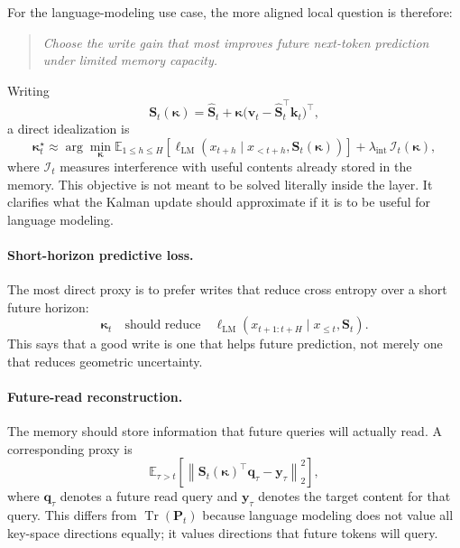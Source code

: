 \documentclass[11pt]{article}
\newcommand{\ve}[1]{\boldsymbol{#1}}
\newcommand{\tr}{\intercal}
\DeclareMathOperator{\Trace}{Tr}
\begin{document}
For the language-modeling use case, the more aligned local question is therefore:
\begin{quote}
  \emph{Choose the write gain that most improves future next-token prediction under limited
  memory capacity.}
\end{quote}
Writing
\[
  \ve{S}_t(\ve{\kappa})
  =
  \widehat{\ve{S}}_t
  +
  \ve{\kappa}
  \big(\ve{v}_t-\widehat{\ve{S}}_t^{\tr}\ve{k}_t\big)^{\tr},
\]
a direct idealization is
\begin{equation}
  \ve{\kappa}_t^\star
  \approx
  \arg\min_{\ve{\kappa}}
  \mathbb{E}_{1\le h\le H}
  \left[
    \ell_{\mathrm{LM}}\!\left(
      x_{t+h}\mid x_{<t+h},\ve{S}_t(\ve{\kappa})
    \right)
  \right]
  +
  \lambda_{\mathrm{int}}\,
  \mathcal{I}_t(\ve{\kappa}),
  \label{eq:lm-predictive-memory-objective}
\end{equation}
where $\mathcal{I}_t$ measures interference with useful contents already stored in the
memory. This objective is not meant to be solved literally inside the layer. It clarifies
what the Kalman update should approximate if it is to be useful for language modeling.

\paragraph{Short-horizon predictive loss.}
The most direct proxy is to prefer writes that reduce cross entropy over a short future
horizon:
\[
  \ve{\kappa}_t
  \quad\text{should reduce}\quad
  \ell_{\mathrm{LM}}(x_{t+1:t+H}\mid x_{\le t},\ve{S}_t).
\]
This says that a good write is one that helps future prediction, not merely one that reduces
geometric uncertainty.

\paragraph{Future-read reconstruction.}
The memory should store information that future queries will actually read. A corresponding
proxy is
\[
  \mathbb{E}_{\tau>t}
  \left[
    \left\|
      \ve{S}_t(\ve{\kappa})^{\tr}\ve{q}_{\tau}
      -
      \ve{y}_{\tau}
    \right\|_2^2
  \right],
\]
where $\ve{q}_{\tau}$ denotes a future read query and $\ve{y}_{\tau}$ denotes the target
content for that query. This differs from $\Trace(\ve{P}_t)$ because language modeling does
not value all key-space directions equally; it values directions that future tokens will
query.
\end{document}
